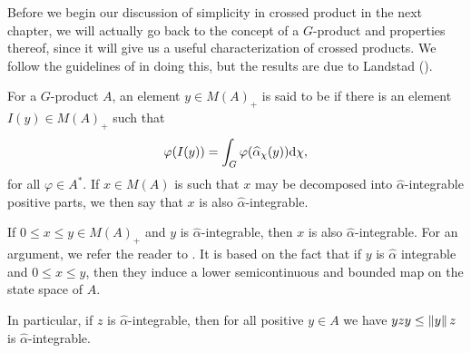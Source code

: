 Before we begin our discussion of simplicity in crossed product in the next chapter, we will actually go back to the concept of a $G$-product and properties thereof, since it will give us a useful characterization of crossed products. We follow the guidelines of \cite{olesenpedersen1} in doing this, but the results are due to Landstad (\cite{landstad1979duality}).
\begin{definition}
	For a $G$-product $A$, an element $y \in M(A)_+$ is said to be  if there is an element $I(y) \in M(A)_+$ such that
	\begin{align*}
		\varphi(I(y)) = \int_G \varphi(\widehat{\alpha}_\chi (y)) \mathrm{d} \chi,
	\end{align*}
	for all $\varphi \in A^*$. If $x \in M(A)$ is such that $x$ may be decomposed into $\hat \alpha$-integrable positive parts, we then say that $x$ is also $\hat \alpha$-integrable.
\end{definition}
\begin{note}
	If $0 \leq x \leq y \in M(A)_+$ and $y$ is $\hat \alpha$-integrable, then $x$ is also $\hat \alpha$-integrable. For an argument, we refer the reader to \cite[Remark 7.8.4]{pedersenalgauto}. It is based on the fact that if $y$ is $\hat \alpha$ integrable and $0 \leq x \leq y$, then they induce a lower semicontinuous and bounded map on the state space of $A$.

	In particular, if $z$ is $\hat \alpha $-integrable, then for all positive $y \in A$ we have $yzy \leq \left\lVert y \right\rVert z$ is $\hat \alpha$-integrable.
\label{noteinthered}
\end{note}


